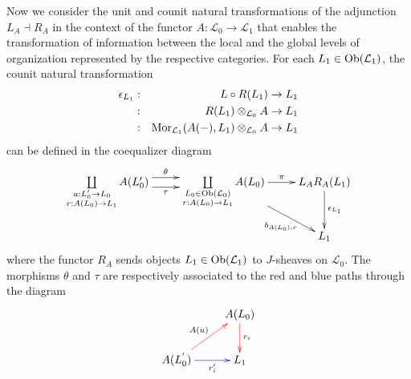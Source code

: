 \documentclass[aps,twocolumn]{revtex4-1}
\begin{document}
Now we consider the unit and counit natural transformations of the adjunction $L_A \dashv R_A$ in the context of the functor $A: \mathcal{L}_0 \rightarrow \mathcal{L}_1$ that enables the transformation of information between the local and the global levels of organization represented by the respective categories. For each $L_1 \in \mathop{\rm Ob}\nolimits(\mathcal{L}_1)$, the counit natural transformation
\begin{eqnarray*}
\epsilon_{L_1} &:& L \circ R(L_1) \rightarrow L_1\\
&:& R(L_1) \otimes_{\mathcal{L}_0} A \rightarrow L_1\\
&:& \mathop{\rm Mor}\nolimits_{\mathcal{L}_1}(A(-),L_1) \otimes_{\mathcal{L}_0} A \rightarrow L_1
\end{eqnarray*}
can be defined in the coequalizer diagram
\begin{displaymath}
\xymatrix{
\coprod\limits_{\substack{u : L'_0 \rightarrow L_0 \\ r:A(L_0) \rightarrow L_1}}
A(L'_0)
\ar@<1ex>[r]^-{\theta} \ar@<-1ex>[r]_-{\tau}
&
\coprod\limits_{\substack{L_0 \in \Ob(\mathcal{L}_0) \\ r:A(L_0) \rightarrow L_1}}
A(L_0)
\ar[r]^-{\pi} \ar[dr]_-{b_{A(L_0),r}}
&
L_A R_A(L_1) \ar[d]^-{\epsilon_{L_1}}\\
& & L_1
}
\end{displaymath}
where the functor $R_A$ sends objects $L_1 \in \mathop{\rm Ob}\nolimits(\mathcal{L}_1)$ to $J$-sheaves on $\mathcal{L}_0$. The morphisms $\theta$ and $\tau$ are respectively associated to the red and blue paths through the diagram
\begin{displaymath}
\xymatrix{
& A(L_0) \ar@[red][d]^{r_i} \\
A(L_0^{'}) \ar@[red][ur]^{A(u)} \ar@[blue][r]_-{r'_i} & L_1
}
\end{displaymath}
\end{document}
